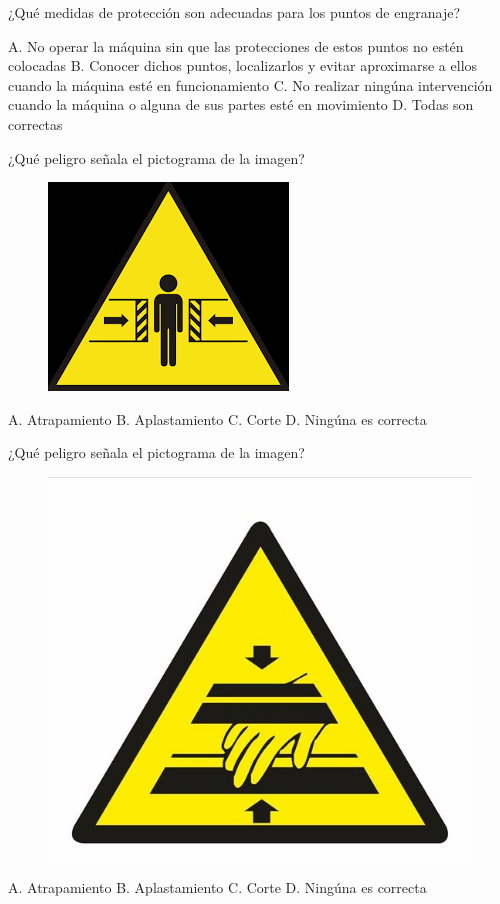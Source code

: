 \documentclass[answers,11pt]{exam}
\begin{document}
{\begin{questions}
\question ¿Qué medidas de protección son adecuadas para los puntos de engranaje?
\begin{checkboxes}
\choice A. No operar la máquina sin que las protecciones de estos puntos no estén colocadas
\choice B. Conocer dichos puntos, localizarlos y evitar aproximarse a ellos cuando la máquina esté en funcionamiento
\choice C. No realizar ningúna intervención cuando la máquina o alguna de sus partes esté en movimiento
\CorrectChoice D. Todas son correctas
\end{checkboxes}

\question ¿Qué peligro señala el pictograma de la imagen?
\begin{figure}[h!]
    \centering
    \includegraphics[scale= 0.8]{aplastamiento.png}
\end{figure}
\begin{checkboxes}
\choice A. Atrapamiento
\CorrectChoice B. Aplastamiento
\choice C. Corte
\choice D. Ningúna es correcta
\end{checkboxes}

\newpage
\question ¿Qué peligro señala el pictograma de la imagen?
\begin{figure}[h!]
    \centering
    \includegraphics[scale= 0.6]{images/corte_mano.jpg}
\end{figure}
\begin{checkboxes}
\choice A. Atrapamiento
\choice B. Aplastamiento
\CorrectChoice C. Corte
\choice D. Ningúna es correcta
\end{checkboxes}
\end{questions}}
\end{document}
